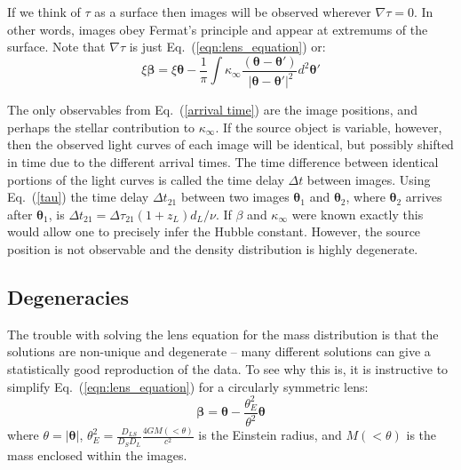 \documentclass[galley,usenatbib]{mn2e}
\newcommand{\eqnref}[1] {Eq.~(\ref{#1})}
\renewcommand{\vec}[1]{\ensuremath{\boldsymbol{#1}}}
\begin{document}
If we think of $\tau$ as a surface then images will be observed wherever
$\nabla \tau = 0$. In other words, images obey Fermat's principle and appear at
extremums of the surface. Note that $\nabla \tau$ is just \eqnref{eqn:lens_equation} or:
\begin{equation}
  \xi \vec\beta = \xi \vec\theta - \frac 1\pi\int \kappa_\infty\frac{(\vec\theta - \vec\theta')}{\ |\vec\theta - \vec\theta'|^2}d^2\vec\theta'
\end{equation}

The only observables from \eqnref{arrival time} are the image positions, and
perhaps the stellar contribution to $\kappa_\infty$.  If the source object is
variable, however, then the observed light curves of each image will be
identical, but possibly shifted in time due to the different arrival times.
The time difference between identical portions of the light curves is called
the time delay $\Delta t$ between images.  Using \eqnref{tau} the time delay
$\Delta t_{21}$ between two images $\vec\theta_1$ and $\vec\theta_2$, where $\vec\theta_2$
arrives after $\vec\theta_1$, is $\Delta t_{21} = \Delta \tau_{21}(1+z_L)d_L /
\nu$. If $\beta$ and $\kappa_\infty$ were known exactly this would allow one
to precisely infer the Hubble constant. However, the source position is not
observable and the density distribution is highly degenerate.

\subsection{Degeneracies}\label{sec:degen} %

The trouble with solving the lens equation for the mass distribution is that the solutions are non-unique and degenerate -- many different solutions can give a statistically good reproduction of the data. To see why this is, it is instructive to simplify \eqnref{eqn:lens_equation} for a circularly symmetric lens: 
%
\begin{equation}
\vec\beta = \vec\theta - \frac{\theta_E^2}{\theta^2}\vec\theta
\label{eqn:lens_equation_circ}
\end{equation}
%
where $\theta = |\vec\theta|$, $\theta_E^2 = \frac{D_{LS}}{D_S D_L} \frac{4 GM(<\theta)}{c^2}$ is the Einstein radius, and $M(<\theta)$ is the mass enclosed within the images. 
\end{document}
